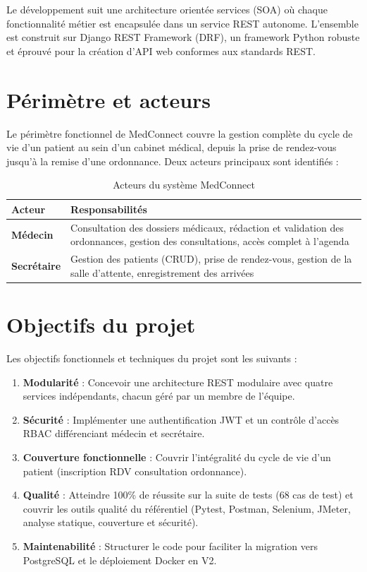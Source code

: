 \documentclass[12pt,a4paper]{report}
\begin{document}
Le développement suit une architecture orientée services (SOA) où chaque fonctionnalité métier est encapsulée dans un service REST autonome. L'ensemble est construit sur Django REST Framework (DRF), un framework Python robuste et éprouvé pour la création d'API web conformes aux standards REST.

\section{Périmètre et acteurs}

Le périmètre fonctionnel de MedConnect couvre la gestion complète du cycle de vie d'un patient au sein d'un cabinet médical, depuis la prise de rendez-vous jusqu'à la remise d'une ordonnance. Deux acteurs principaux sont identifiés :

\renewcommand{\arraystretch}{1.4}
\begin{table}[H]
\centering
\caption{Acteurs du système MedConnect}
\begin{tabular}{|p{3.5cm}|p{10cm}|}
  \hline
  \rowcolor{medaccent}
  \textbf{Acteur} & \textbf{Responsabilités} \\
  \hline
  \textbf{Médecin} & Consultation des dossiers médicaux, rédaction et validation des ordonnances, gestion des consultations, accès complet à l'agenda \\
  \hline
  \textbf{Secrétaire} & Gestion des patients (CRUD), prise de rendez-vous, gestion de la salle d'attente, enregistrement des arrivées \\
  \hline
\end{tabular}
\end{table}

\section{Objectifs du projet}

Les objectifs fonctionnels et techniques du projet sont les suivants :

\begin{enumerate}[leftmargin=*, label=\textbf{O\arabic*.}]
  \item \textbf{Modularité} : Concevoir une architecture REST modulaire avec quatre services indépendants, chacun géré par un membre de l'équipe.
  \item \textbf{Sécurité} : Implémenter une authentification JWT et un contrôle d'accès RBAC différenciant médecin et secrétaire.
  \item \textbf{Couverture fonctionnelle} : Couvrir l'intégralité du cycle de vie d'un patient (inscription \textrightarrow{} RDV \textrightarrow{} consultation \textrightarrow{} ordonnance).
  \item \textbf{Qualité} : Atteindre 100\% de réussite sur la suite de tests (68 cas de test) et couvrir les outils qualité du référentiel (Pytest, Postman, Selenium, JMeter, analyse statique, couverture et sécurité).
  \item \textbf{Maintenabilité} : Structurer le code pour faciliter la migration vers PostgreSQL et le déploiement Docker en V2.
\end{enumerate}
\end{document}
